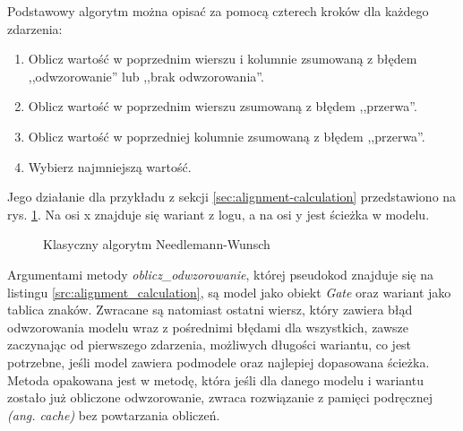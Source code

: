 Podstawowy algorytm można opisać za pomocą czterech kroków dla każdego zdarzenia:  
\begin{enumerate}
  \item Oblicz wartość w poprzednim wierszu i kolumnie zsumowaną z błędem ,,odwzorowanie'' lub ,,brak odwzorowania''.
  \item Oblicz wartość w poprzednim wierszu zsumowaną z błędem ,,przerwa''.
  \item Oblicz wartość w poprzedniej kolumnie zsumowaną z błędem ,,przerwa''.
  \item Wybierz najmniejszą wartość.
\end{enumerate}

Jego działanie dla przykładu z sekcji \ref{sec:alignment-calculation} przedstawiono na rys. \ref{fig:algo_example}. Na osi x znajduje się wariant z logu, a na osi y jest ścieżka w modelu.

\begin{figure}[H]
	\caption{\label{fig:algo_example}Klasyczny algorytm Needlemann-Wunsch \cite{NW-example}}
\end{figure}


Argumentami metody \textit{oblicz{\_}odwzorowanie}, której pseudokod znajduje się na listingu \ref{src:alignment_calculation}, są model jako obiekt \textit{Gate} oraz wariant jako tablica znaków. Zwracane są natomiast ostatni wiersz, który zawiera błąd odwzorowania modelu wraz z pośrednimi błędami dla wszystkich, zawsze zaczynając od pierwszego zdarzenia, możliwych długości wariantu, co jest potrzebne, jeśli model zawiera podmodele oraz najlepiej dopasowana ścieżka. Metoda opakowana jest w metodę, która jeśli dla danego modelu i wariantu zostało już obliczone odwzorowanie, zwraca rozwiązanie z pamięci podręcznej \textit{(ang. cache)} bez powtarzania obliczeń.

